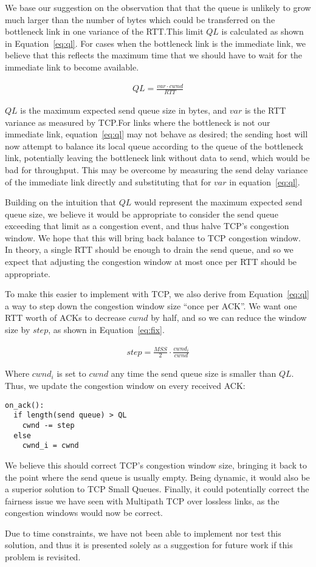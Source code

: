 We base our suggestion on the observation that that the queue is unlikely to
grow much larger than the number of bytes which could be transferred on the
bottleneck link in one variance of the RTT.\@ This limit $QL$ is calculated
as shown in Equation~\ref{eq:ql}. For cases when the bottleneck link
is the immediate link, we believe that this reflects the maximum time that
we should have to wait for the immediate link to become available. 

\begin{align}
  QL = \frac{var \cdot cwnd}{RTT}\label{eq:ql}
\end{align}

$QL$ is the maximum expected send queue size in bytes, and $var$ is the RTT
variance as measured by TCP.\@ For links where the bottleneck is not our immediate
link, equation~\ref{eq:ql} may not behave as desired; the sending host will now
attempt to balance its local queue according to the queue of the bottleneck
link, potentially leaving the bottleneck link without data to send, which would
be bad for throughput. This may be overcome by measuring the send delay variance
of the immediate link directly and substituting that for $var$ in
equation~\ref{eq:ql}.

Building on the intuition that $QL$ would represent the maximum expected send
queue size, we believe it would be appropriate to consider the send queue
exceeding that limit as a congestion event, and thus halve TCP's congestion
window. We hope that this will bring back balance to TCP congestion window. In
theory, a single RTT should be enough to drain the send queue, and so we expect
that adjusting the congestion window at most once per RTT should be appropriate.

To make this easier to implement with TCP, we also derive from Equation~\ref{eq:ql}
a way to step down the congestion window size ``once per ACK''. We want one RTT
worth of ACKs to decrease $cwnd$ by half, and so we can reduce the window size
by $step$, as shown in Equation~\ref{eq:fix}.

\begin{align}
  step = \frac{MSS}{2} \cdot \frac{cwnd_i}{cwnd}\label{eq:fix}
\end{align}

Where $cwnd_i$ is set to $cwnd$ any time the send queue size is smaller than $QL$.
Thus, we update the congestion window on every received ACK:

\begin{verbatim}
on_ack():
  if length(send queue) > QL
    cwnd -= step
  else
    cwnd_i = cwnd
\end{verbatim}

We believe this should correct TCP's congestion window size, bringing it back to
the point where the send queue is usually empty. Being dynamic, it would also be
a superior solution to TCP Small Queues. Finally, it could potentially correct the fairness
issue we have seen with Multipath TCP over lossless links, as the congestion
windows would now be correct.

Due to time constraints, we have not been able to implement nor test this
solution, and thus it is presented solely as a suggestion for future work if
this problem is revisited.
